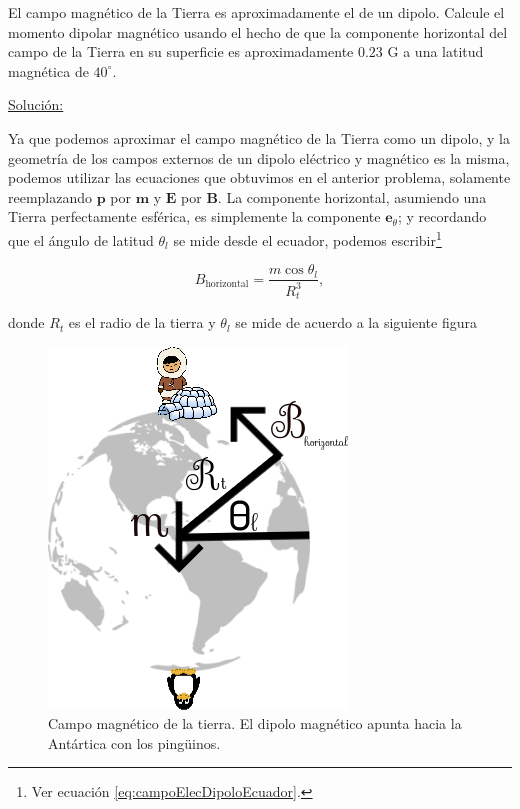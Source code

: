 \documentclass[a4paper,11pt]{article}
\numberwithin{equation}{section}
\begin{document}
El campo magnético de la Tierra es aproximadamente el de un dipolo. Calcule el momento 
dipolar magnético usando el hecho de que la componente horizontal del campo de la 
Tierra en su superficie es aproximadamente $0.23$ G a una latitud magnética de 
$40^\circ$.

\vspace{.3cm}

\underline{Solución:} \vspace{.3cm}

Ya que podemos aproximar el campo magnético de la Tierra como un dipolo, y la geometría
de los campos externos de un dipolo eléctrico y magnético es la misma, podemos utilizar 
las ecuaciones que obtuvimos en el anterior problema, solamente reemplazando $\mathbf{p}$ 
por $\mathbf{m}$ y $\mathbf{E}$ por $\mathbf{B}$. La componente horizontal, asumiendo 
una Tierra perfectamente esférica, es simplemente la componente $\mathbf{e}_\theta$; 
y recordando que el ángulo de latitud $\theta_l$ se mide desde el ecuador, podemos 
escribir\footnote{Ver ecuación \eqref{eq:campoElecDipoloEcuador}.}

\begin{equation}
 B_{\text{horizontal}} = \frac{m\cos{\theta_l}}{R_t^3},
 \label{eq:campoMagnDipoloTierra}
\end{equation}

  donde $R_t$ es el radio de la tierra y  $\theta_l$ se mide de acuerdo a la siguiente 
figura 


\begin{figure}[H]
 \center 
 \includegraphics[scale=0.5]{problema2fig1}
 \caption{Campo magnético de la tierra. El dipolo magnético apunta 
 hacia la Antártica con los pingüinos.}
 \label{fig:problema2fig1}
\end{figure}
\end{document}

